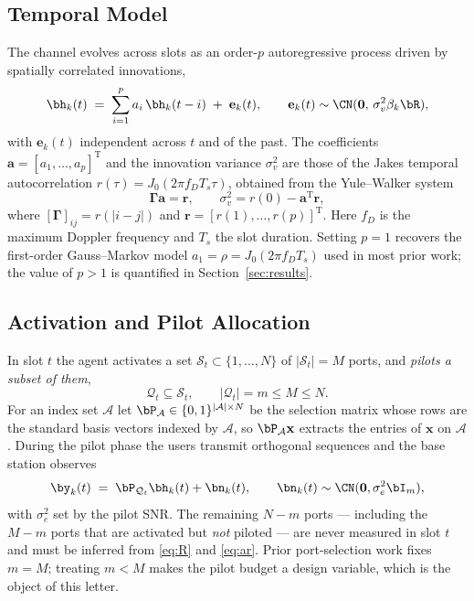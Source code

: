 \subsection{Temporal Model}
The channel evolves across slots as an order-$p$ autoregressive process driven
by spatially correlated innovations,
\begin{equation}
  \bh_k(t) \;=\; \sum_{i=1}^{p} a_i\,\bh_k(t-i) \;+\; \mathbf{e}_k(t),
  \qquad
  \mathbf{e}_k(t)\sim\CN(\mathbf{0},\,\sigma_v^2\beta_k\bR),
  \label{eq:ar}
\end{equation}
with $\mathbf{e}_k(t)$ independent across $t$ and of the past. The coefficients
$\mathbf{a}=[a_1,\dots,a_p]^{\mathrm{T}}$ and the innovation variance
$\sigma_v^2$ are those of the Jakes temporal autocorrelation
$r(\tau)=J_0(2\pi f_D T_s \tau)$, obtained from the Yule--Walker system
\begin{equation}
  \boldsymbol{\Gamma}\mathbf{a}=\mathbf{r},
  \qquad
  \sigma_v^2 = r(0)-\mathbf{a}^{\mathrm{T}}\mathbf{r},
  \label{eq:yw}
\end{equation}
where $[\boldsymbol{\Gamma}]_{ij}=r(|i-j|)$ and
$\mathbf{r}=[r(1),\dots,r(p)]^{\mathrm{T}}$. Here $f_D$ is the maximum Doppler
frequency and $T_s$ the slot duration. Setting $p=1$ recovers the first-order
Gauss--Markov model $a_1=\rho=J_0(2\pi f_D T_s)$ used in most prior work; the
value of $p>1$ is quantified in Section~\ref{sec:results}.

\subsection{Activation and Pilot Allocation}
In slot $t$ the agent activates a set $\mathcal{S}_t\subset\{1,\dots,N\}$ of
$|\mathcal{S}_t|=M$ ports, and \emph{pilots a subset of them},
\begin{equation}
  \mathcal{Q}_t \subseteq \mathcal{S}_t,
  \qquad |\mathcal{Q}_t| = m \le M \le N .
  \label{eq:sets}
\end{equation}
For an index set $\mathcal{A}$ let
$\bP_{\mathcal{A}}\in\{0,1\}^{|\mathcal{A}|\times N}$ be the selection matrix
whose rows are the standard basis vectors indexed by $\mathcal{A}$, so
$\bP_{\mathcal{A}}\mathbf{x}$ extracts the entries of $\mathbf{x}$ on
$\mathcal{A}$. During the pilot phase the users transmit orthogonal sequences
and the base station observes
\begin{equation}
  \by_k(t) \;=\; \bP_{\mathcal{Q}_t}\bh_k(t) + \bn_k(t),
  \qquad
  \bn_k(t)\sim\CN(\mathbf{0},\sigma_e^2\bI_m),
  \label{eq:obs}
\end{equation}
with $\sigma_e^2$ set by the pilot SNR. The remaining $N-m$ ports --- including
the $M-m$ ports that are activated but \emph{not} piloted --- are never
measured in slot $t$ and must be inferred from \eqref{eq:R} and \eqref{eq:ar}.
Prior port-selection work fixes $m=M$; treating $m<M$ makes the pilot budget a
design variable, which is the object of this letter.

